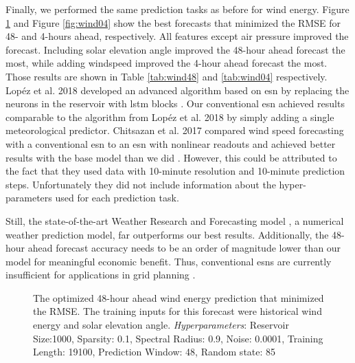 Finally, we performed the same prediction tasks as before for wind energy.
Figure \ref{fig:wind48} and Figure \ref{fig:wind04} show the best forecasts
that minimized the RMSE for
48- and 4-hours ahead, respectively. All features except air pressure improved
the forecast. Including solar elevation angle improved the 48-hour ahead
forecast the most, while adding windspeed improved the 4-hour ahead forecast
the most. Those results are shown in Table \ref{tab:wind48} and \ref{tab:wind04}
respectively. Lop\'ez et al. 2018 developed an advanced algorithm based on
\gls{esn} by replacing the neurons in the reservoir with \gls{lstm} blocks \cite{lopez_wind_2018}. Our conventional \gls{esn} achieved
results comparable to the algorithm from Lop\'ez et al. 2018 by simply adding a
single meteorological predictor.
Chitsazan et al. 2017 \cite{chitsazan_wind_2017} compared wind speed
forecasting with a conventional \gls{esn} to an \gls{esn} with nonlinear
readouts and achieved better results with the base model than we did
\cite{chitsazan_wind_2017}. However, this could be attributed to the fact that
they used data with 10-minute resolution and 10-minute prediction steps.
Unfortunately they did not include information about the hyper-parameters used
for each prediction task.

Still, the state-of-the-art Weather Research and Forecasting model
\cite{powers_weather_2017}, a numerical weather prediction model, far
outperforms our best results. Additionally, the 48-hour ahead forecast accuracy
needs to be an order of magnitude lower than our model for meaningful economic
benefit. Thus, conventional \glspl{esn} are currently insufficient for
applications in grid planning \cite{wang_quantifying_2016}.

\begin{figure}[H]
  \centering
  \resizebox{\columnwidth}{!}{}
  \caption{The optimized 48-hour ahead wind energy prediction that minimized
  the RMSE. The training inputs for this forecast were historical wind energy and solar elevation
  angle. \textit{Hyperparameters}: Reservoir Size:1000, Sparsity: 0.1, Spectral
  Radius: 0.9, Noise: 0.0001, Training Length: 19100, Prediction Window: 48,
  Random state: 85}
  \label{fig:wind48}
\end{figure}

